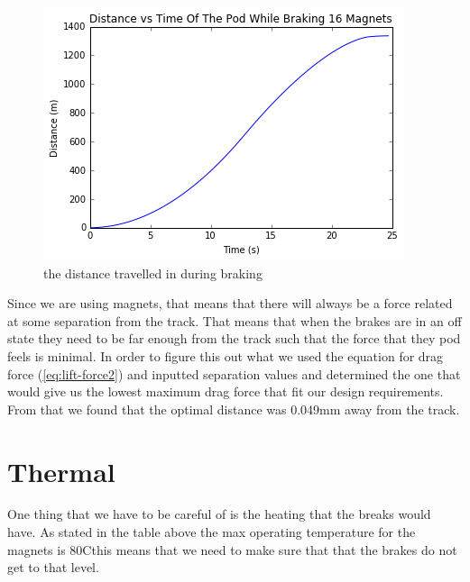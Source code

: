 \documentclass[main.tex]{subfiles}
\begin{document}
    \begin{figure}
        \centering
        \includegraphics[width=\linewidth]{images/totaldistanceprofile}
        \caption{the distance travelled in during braking}
        \label{fig:distance-profile}
    \end{figure}
    
    Since we are using magnets, that means that there will always be a force related at some separation from the track. That means that when the brakes are in an off state they need to be far enough from the track such that the force that they pod feels is minimal. In order to figure this out what we used the equation for drag force (\ref{eq:lift-force2}) and inputted separation values and determined the one that would give us the lowest maximum drag force that fit our design requirements. From that we found that the optimal distance was 0.049mm away from the track.    
    
    \section{Thermal}
    One thing that we have to be careful of is the heating that the breaks would have. As stated in the table above the max operating temperature for the magnets is $80$C\textdegree this means that we need to make sure that that the brakes do not get to that level.\\
\end{document}
